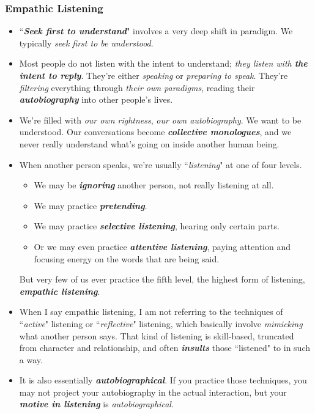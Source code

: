 \documentclass[11pt]{article}
\begin{document}
\subsubsection{Empathic Listening}
\begin{itemize}
\item ``\emph{\textbf{Seek first to understand}}" involves a very deep shift in paradigm. We typically \emph{seek first to be understood}. 

\item Most people do not listen with the intent to understand; \emph{they listen with \textbf{the intent to reply}}. They're either \emph{speaking} or \emph{preparing to speak}. They're \emph{filtering} everything through \emph{their own paradigms}, reading their \emph{\textbf{autobiography}} into other people's lives.

\item We're filled with \emph{our own rightness}, \emph{our own autobiography}. We want to be understood. Our conversations become \emph{\textbf{collective monologues}}, and we never really understand what's going on inside another human being.

\item When another person speaks, we're usually ``\emph{listening}" at one of four levels. 
\begin{itemize}
\item We may be \emph{\textbf{ignoring}} another person, not really listening at all. 
\item We may practice \emph{\textbf{pretending}}. 
\item We may practice \emph{\textbf{selective listening}}, hearing only certain parts.
\item Or we may even practice \emph{\textbf{attentive listening}}, paying attention and focusing energy on the words that are being said.
\end{itemize} But very few of us ever practice the fifth level, the highest form of listening, \emph{\textbf{empathic listening}}.

\item When I say empathic listening, I am not referring to the techniques of ``\emph{active}" listening or ``\emph{reflective}" listening, which basically involve \emph{mimicking} what another person says. That kind of listening is skill-based, truncated from character and relationship, and often \emph{\textbf{insults}} those ``listened" to in such a way. 

\item It is also essentially \emph{\textbf{autobiographical}}. If you practice those techniques, you may not project your autobiography in the actual interaction, but your \emph{\textbf{motive in listening}} is \emph{autobiographical}.


\end{itemize}
\end{document}
